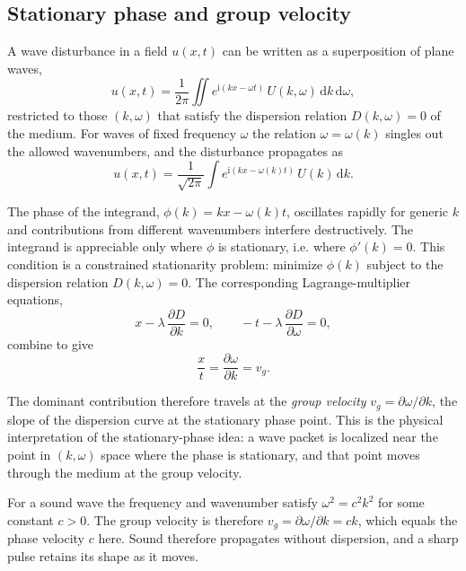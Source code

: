 \subsection{Stationary phase and group velocity}

A wave disturbance in a field $u(x,t)$ can be written as a superposition of plane waves,
\begin{equation}
u(x,t)=\frac{1}{2\pi}\iint e^{\mathrm{i}(kx-\omega t)}\,U(k,\omega)\,\mathrm{d}k\,\mathrm{d}\omega,
\end{equation}
restricted to those $(k,\omega)$ that satisfy the dispersion relation $D(k,\omega)=0$ of the medium. For waves of fixed frequency $\omega$ the relation $\omega=\omega(k)$ singles out the allowed wavenumbers, and the disturbance propagates as
\begin{equation}
u(x,t)=\frac{1}{\sqrt{2\pi}}\int e^{\mathrm{i}(kx-\omega(k)t)}\,U(k)\,\mathrm{d}k.
\end{equation}

The phase of the integrand, $\phi(k)=kx-\omega(k)t$, oscillates rapidly for generic $k$ and contributions from different wavenumbers interfere destructively. The integrand is appreciable only where $\phi$ is stationary, i.e. where $\phi'(k)=0$. This condition is a constrained stationarity problem: minimize $\phi(k)$ subject to the dispersion relation $D(k,\omega)=0$. The corresponding Lagrange-multiplier equations,
\begin{equation}
x-\lambda\,\frac{\partial D}{\partial k}=0,
\qquad
-t-\lambda\,\frac{\partial D}{\partial \omega}=0,
\end{equation}
combine to give
\begin{equation}
\frac{x}{t}=\frac{\partial\omega}{\partial k}=v_g.
\end{equation}

The dominant contribution therefore travels at the \emph{group velocity} $v_g=\partial\omega/\partial k$, the slope of the dispersion curve at the stationary phase point. This is the physical interpretation of the stationary-phase idea: a wave packet is localized near the point in $(k,\omega)$ space where the phase is stationary, and that point moves through the medium at the group velocity.

\begin{example}
For a sound wave the frequency and wavenumber satisfy $\omega^2=c^2k^2$ for some constant $c>0$. The group velocity is therefore $v_g=\partial\omega/\partial k=ck$, which equals the phase velocity $c$ here. Sound therefore propagates without dispersion, and a sharp pulse retains its shape as it moves.
\end{example}

